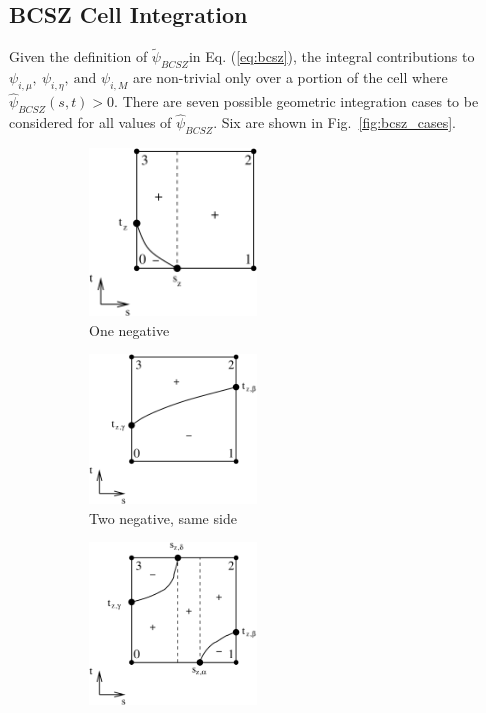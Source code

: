 \documentclass{mc2015}
\newcommand{\fig}[1]{Fig.~\ref{#1}}                      %
\newcommand{\eqt}[1]{Eq. (\ref{#1})}  %
\newcommand{\BCSZ}{\ensuremath{\widetilde{\psi}_{BCSZ}}}
\newcommand{\BCSZH}{\ensuremath{\widehat{\psi}_{BCSZ}}}
\begin{document}
\subsection{BCSZ Cell Integration}
Given the definition of \BCSZ in \eqt{eq:bcsz}, the integral contributions to $\psi_{i,\mu},~\psi_{i,\eta},~\text{and }\psi_{i,M}$ are non-trivial only over a portion of the cell where $\BCSZH(s,t) > 0$.
There are seven possible geometric integration cases to be considered for all values of \BCSZH.  Six are shown in \fig{fig:bcsz_cases}.
\begin{figure}[h]
\begin{center}
	\begin{subfigure}{0.32\textwidth}
		\begin{center}
		\includegraphics[width=1.75in]{one_neg_pdt_int} 		
		\caption{One negative}
		\label{fig:one_node}
		\end{center}
	\end{subfigure}
	\begin{subfigure}{0.32\textwidth}
		\begin{center}
		\includegraphics[width=1.75in]{neg_same_side_pdt_int}
		\caption{Two negative, same side}
		\label{fig:two_same_side}
		\end{center}
	\end{subfigure}
	\begin{subfigure}{0.32\textwidth}
		\begin{center}
		\includegraphics[width=1.75in]{opp_neg_more_pos_pdt_int}

\end{center}
\end{subfigure}
\end{center}
\end{figure}
\end{document}
